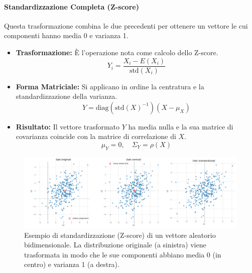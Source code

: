 \paragraph{Standardizzazione Completa (Z-score)}
Questa trasformazione combina le due precedenti per ottenere un vettore le cui
componenti hanno media 0 e varianza 1.
\begin{itemize}
    \item \textbf{Trasformazione:} È l'operazione nota come calcolo dello
    Z-score.
    \[ Y_i = \frac{X_i - E(X_i)}{\text{std}(X_i)} \]
    \item \textbf{Forma Matriciale:} Si applicano in ordine la centratura e la
    standardizzazione della varianza.
    \[ Y = \text{diag}(\text{std}(X)^{-1}) (X - \mu_X) \]
    \item \textbf{Risultato:} Il vettore trasformato \(Y\) ha media nulla e la
    sua matrice di covarianza coincide con la matrice di correlazione di \(X\).
    \[ \mu_Y = 0, \quad \Sigma_Y = \rho(X) \]
\end{itemize}

\begin{figure}[H]
    \centering
    \includegraphics[width=\textwidth]{images/th_07_09/z_transformation.png}
    \caption{Esempio di standardizzazione (Z-score) di un vettore aleatorio bidimensionale. La distribuzione originale (a sinistra) viene trasformata in modo che le sue componenti abbiano media 0 (in centro) e varianza 1 (a destra).}
    \label{fig:z_transformation}
\end{figure}